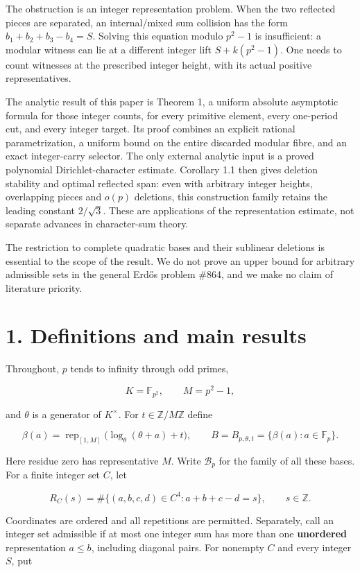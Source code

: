 \documentclass[11pt,a4paper]{article}
\begin{document}
The obstruction is an integer representation problem. When the two reflected pieces are separated, an internal/mixed sum collision has the form \(b_1+b_2+b_3-b_4=S\). Solving this equation modulo \(p^2-1\) is insufficient: a modular witness can lie at a different integer lift \(S+k(p^2-1)\). One needs to count witnesses at the prescribed integer height, with its actual positive representatives.

The analytic result of this paper is Theorem 1, a uniform absolute asymptotic formula for those integer counts, for every primitive element, every one-period cut, and every integer target. Its proof combines an explicit rational parametrization, a uniform bound on the entire discarded modular fibre, and an exact integer-carry selector. The only external analytic input is a proved polynomial Dirichlet-character estimate. Corollary 1.1 then gives deletion stability and optimal reflected span: even with arbitrary integer heights, overlapping pieces and \(o(p)\) deletions, this construction family retains the leading constant \(2/\sqrt3\). These are applications of the representation estimate, not separate advances in character-sum theory.

The restriction to complete quadratic bases and their sublinear deletions is essential to the scope of the result. We do not prove an upper bound for arbitrary admissible sets in the general Erdős problem \#864, and we make no claim of literature priority.

\section{1. Definitions and main results}\label{definitions-and-main-results}

Throughout, \(p\) tends to infinity through odd primes,

\[K=\mathbb F_{p^2},\qquad M=p^2-1,\]

and \(\theta\) is a generator of \(K^{\times}\). For \(t\in\mathbb Z/M\mathbb Z\) define

\[\beta(a)=\operatorname{rep}_{[1,M]}
       \bigl(\log_\theta(\theta+a)+t\bigr),\qquad
B=B_{p,\theta,t}=\{\beta(a):a\in\mathbb F_p\}.
\tag{1}\]

Here residue zero has representative \(M\). Write \(\mathcal B_p\) for the family of all these bases. For a finite integer set \(C\), let

\[R_C(s)=\#\{(a,b,c,d)\in C^4:a+b+c-d=s\},\qquad s\in\mathbb Z.
\tag{2}\]

Coordinates are ordered and all repetitions are permitted. Separately, call an integer set admissible if at most one integer sum has more than one \textbf{unordered} representation \(a\le b\), including diagonal pairs. For nonempty \(C\) and every integer \(S\), put
\end{document}
